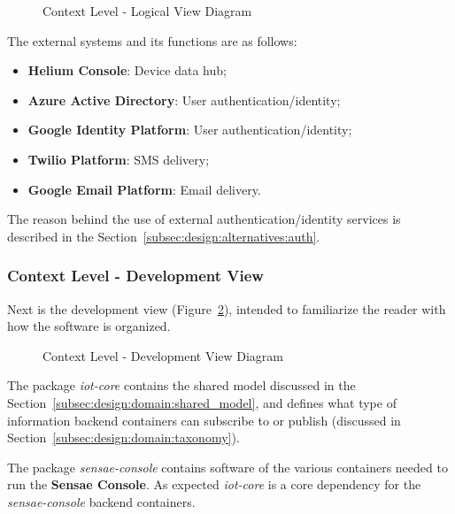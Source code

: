 \begin{figure}[H]
   \centering
   \resizebox{\columnwidth}{!}
   {
      
   }
   \caption[Context Level - Logical View Diagram]{Context Level - Logical View Diagram}
   \label{fig:design:architecture:context:logical:diagram}
\end{figure}

The external systems and its functions are as follows:
\begin{itemize}
   \item \textbf{Helium Console}: Device data hub;
   \item \textbf{Azure Active Directory}: User authentication/identity;
   \item \textbf{Google Identity Platform}: User authentication/identity;
   \item \textbf{Twilio Platform}: SMS delivery;
   \item \textbf{Google Email Platform}: Email delivery.
\end{itemize}

The reason behind the use of external authentication/identity services is described in the Section~\ref{subsec:design:alternatives:auth}.

\subsubsection{Context Level - Development View}
\label{subsubsec:design:architecture:context:development}

Next is the development view (Figure~\ref{fig:design:architecture:context:development:diagram}), intended to familiarize the reader with how the software is organized.

\begin{figure}[H]
   \centering
      
   \caption[Context Level - Development View Diagram]{Context Level - Development View Diagram}
   \label{fig:design:architecture:context:development:diagram}
\end{figure}

The package \textit{iot-core} contains the shared model discussed in the Section~\ref{subsec:design:domain:shared_model}, and defines what type of information backend containers can subscribe to or publish (discussed in Section~\ref{subsec:design:domain:taxonomy}).

The package \textit{sensae-console} contains software of the various containers needed to run the \textbf{Sensae Console}. As expected \textit{iot-core} is a core dependency for the \textit{sensae-console} backend containers.

